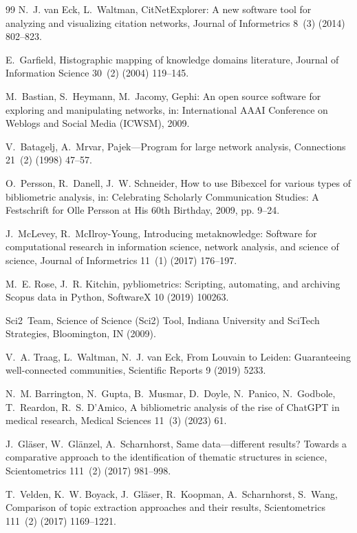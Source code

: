 \documentclass[preprint,12pt]{elsarticle}
\begin{document}
\begin{thebibliography}{99}
N.~J. van Eck, L.~Waltman, CitNetExplorer: A new software tool for analyzing and visualizing citation networks, Journal of Informetrics 8~(3) (2014) 802--823.

E.~Garfield, Histographic mapping of knowledge domains literature, Journal of Information Science 30~(2) (2004) 119--145.

M.~Bastian, S.~Heymann, M.~Jacomy, Gephi: An open source software for exploring and manipulating networks, in: International AAAI Conference on Weblogs and Social Media (ICWSM), 2009.

V.~Batagelj, A.~Mrvar, Pajek---Program for large network analysis, Connections 21~(2) (1998) 47--57.

O.~Persson, R.~Danell, J.~W. Schneider, How to use Bibexcel for various types of bibliometric analysis, in: Celebrating Scholarly Communication Studies: A Festschrift for Olle Persson at His 60th Birthday, 2009, pp. 9--24.

J.~McLevey, R.~McIlroy-Young, Introducing metaknowledge: Software for computational research in information science, network analysis, and science of science, Journal of Informetrics 11~(1) (2017) 176--197.

M.~E. Rose, J.~R. Kitchin, pybliometrics: Scripting, automating, and archiving Scopus data in Python, SoftwareX 10 (2019) 100263.

Sci2~Team, Science of Science (Sci2) Tool, Indiana University and SciTech Strategies, Bloomington, IN (2009).

V.~A. Traag, L.~Waltman, N.~J. van Eck, From Louvain to Leiden: Guaranteeing well-connected communities, Scientific Reports 9 (2019) 5233.

N.~M. Barrington, N.~Gupta, B.~Musmar, D.~Doyle, N.~Panico, N.~Godbole, T.~Reardon, R.~S. D'Amico, A bibliometric analysis of the rise of ChatGPT in medical research, Medical Sciences 11~(3) (2023) 61.

J.~Gl{\"a}ser, W.~Gl{\"a}nzel, A.~Scharnhorst, Same data---different results? Towards a comparative approach to the identification of thematic structures in science, Scientometrics 111~(2) (2017) 981--998.

T.~Velden, K.~W. Boyack, J.~Gl{\"a}ser, R.~Koopman, A.~Scharnhorst, S.~Wang, Comparison of topic extraction approaches and their results, Scientometrics 111~(2) (2017) 1169--1221.


\end{thebibliography}
\end{document}
